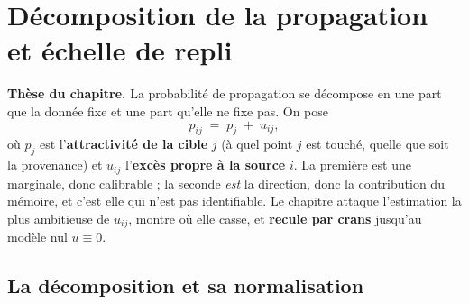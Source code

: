 \chapter{Décomposition de la propagation et échelle de repli}
\label{ch:decomposition}

\begin{cle}
\textbf{Thèse du chapitre.} La probabilité de propagation se décompose en une part que la
donnée fixe et une part qu'elle ne fixe pas. On pose
\[
  p_{ij} \;=\; p_j \;+\; u_{ij},
\]
où $p_j$ est l'\textbf{attractivité de la cible} $j$ (à quel point $j$ est touché, quelle que
soit la provenance) et $u_{ij}$ l'\textbf{excès propre à la source} $i$. La première est une
marginale, donc calibrable ; la seconde \emph{est} la direction, donc la contribution du
mémoire, et c'est elle qui n'est pas identifiable. Le chapitre attaque l'estimation la plus
ambitieuse de $u_{ij}$, montre où elle casse, et \textbf{recule par crans} jusqu'au modèle
nul $u \equiv 0$.
\end{cle}

\section{La décomposition et sa normalisation}


